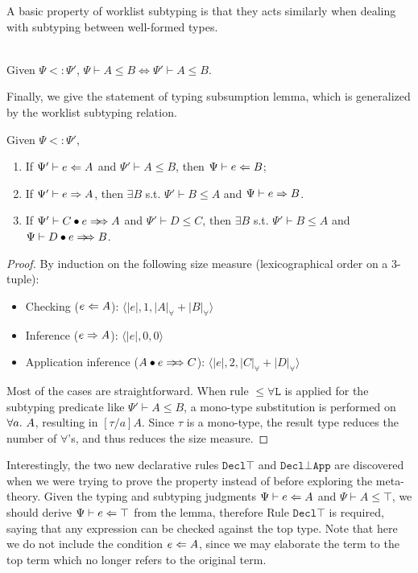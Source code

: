 A basic property of worklist subtyping is that they acts similarly when
dealing with subtyping between well-formed types.
\begin{lemma}~\\
    Given $\Psi <: \Psi'$, $\Psi \vdash A \le B \Longleftrightarrow \Psi' \vdash A \le B$.
\end{lemma}

Finally, we give the statement of typing subsumption lemma,
which is generalized by the worklist subtyping relation.

\begin{lemma}
    Given $\Psi <: \Psi'$,
    \begin{enumerate}[1)]
        \item If $\Psi' \vdash e \Leftarrow A$ and $\Psi' \vdash A \le B$, then $\Psi \vdash e \Leftarrow B$;
        \item If $\Psi' \vdash e \Rightarrow A$, then $\exists B$ s.t. $\Psi' \vdash B \le A$ and $\Psi \vdash e \Rightarrow B$.
        \item If $\Psi' \vdash \appInf{C}{e}{A}$ and $\Psi' \vdash D \le C$, then
            $\exists B$ s.t. $\Psi' \vdash B \le A$ and $\Psi \vdash \appInf{D}{e}{B}$.
    \end{enumerate}
\end{lemma}

\begin{proof}
    By induction on the following size measure (lexicographical order on a 3-tuple):
    \begin{itemize}
        \item Checking ($e \Leftarrow A$): $\langle |e|, 1, |A|_\forall + |B|_\forall \rangle$
        \item Inference ($e \Rightarrow A$): $\langle |e|, 0, 0 \rangle$
        \item Application inference ($\appInf{A}{e}{C}$): $\langle |e|, 2, |C|_\forall + |D|_\forall \rangle$
    \end{itemize}
    Most of the cases are straightforward.
    When rule $\mathtt{{\le}\forall L}$ is applied for the subtyping predicate
    like $\Psi' \vdash A \le B$,
    a mono-type substitution is performed on $\all A$,
    resulting in $[\tau/a]A$.
    Since $\tau$ is a mono-type, the result type reduces the number of $\forall$'s,
    and thus reduces the size measure.
\end{proof}

Interestingly, the two new declarative rules
$\mathtt{Decl\top}$ and $\mathtt{Decl{\bot}App}$ are
discovered when we were trying to prove the property instead of
before exploring the meta-theory.
Given the typing and subtyping judgments $\Psi \vdash e \Leftarrow A$ and $\Psi \vdash A \le \top$,
we should derive $\Psi \vdash e \Leftarrow \top$ from the lemma,
therefore Rule $\mathtt{Decl\top}$ is required,
saying that any expression can be checked against the top type.
Note that here we do not include the condition $e \Leftarrow A$,
since we may elaborate the term to the top term
which no longer refers to the original term.

